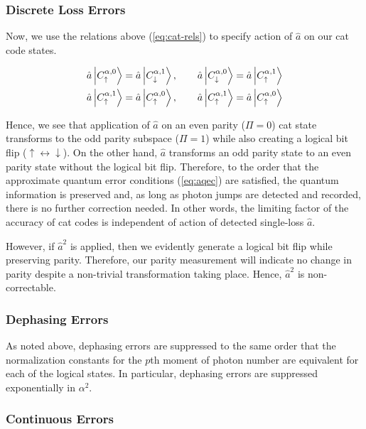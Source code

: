 \documentclass[12]{amsart}
\newcommand\0{\mathbf{0}}
\newcommand\<{\langle}
\renewcommand\>{\rangle}
\begin{document}
\subsubsection{Discrete Loss Errors}

Now, we use the relations above (\ref{eq:cat-rels}) to specify action of $\hat{a}$ on our cat code states.

\begin{align*}
\hat{a}	\ket{C^{\alpha, 0}_{\uparrow}} &= \hat{a}	\ket{C^{\alpha, 1}_{\downarrow}}, \qquad
\hat{a}	\ket{C^{\alpha, 0}_{\downarrow}} = \hat{a}	\ket{C^{\alpha, 1}_{\uparrow}}\\
\hat{a}	\ket{C^{\alpha, 1}_{\uparrow}} &= \hat{a}	\ket{C^{\alpha, 0}_{\uparrow}},\qquad 
\hat{a}	\ket{C^{\alpha, 1}_{\uparrow}} = \hat{a}	\ket{C^{\alpha, 0}_{\uparrow}}
\end{align*}

Hence, we see that application of $\hat{a}$ on an even parity ($\Pi = 0$) cat state transforms to the odd parity subspace ($\Pi = 1$) while also creating a logical bit flip ($\uparrow \leftrightarrow \downarrow$). On the other hand, $\hat{a}$ transforms an odd parity state to an even parity state without the logical bit flip. Therefore, to the order that the approximate quantum error conditions (\ref{eq:aqec}) are satisfied, the quantum information is preserved and, as long as photon jumps are detected and recorded, there is no further correction needed. In other words, the limiting factor of the accuracy of cat codes is independent of action of detected single-loss $\hat{a}$.

However, if $\hat{a}^2$ is applied, then we evidently generate a logical bit flip while preserving parity. Therefore, our parity measurement will indicate no change in parity despite a non-trivial transformation taking place. Hence, $\hat{a}^2$ is non-correctable.

\subsubsection{Dephasing Errors}
\label{sec:cat-deph}

As noted above, dephasing errors are suppressed to the same order that the normalization constants for the $p$th moment of photon number are equivalent for each of the logical states. In particular, dephasing errors are suppressed exponentially in $\alpha^2$.

\subsubsection{Continuous Errors}
\end{document}

